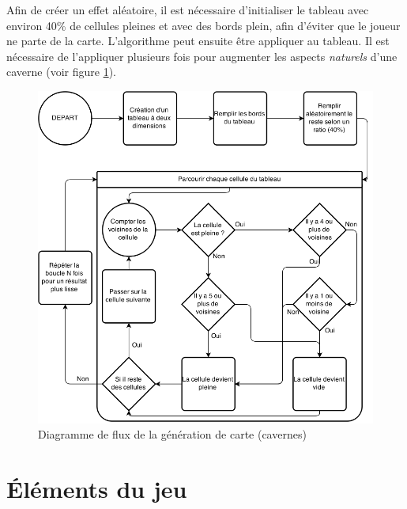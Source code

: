 \documentclass[11pt, a4paper, oneside]{report}
\begin{document}
Afin de créer un effet aléatoire, il est nécessaire d'initialiser le tableau avec environ 40\% de cellules pleines et avec des bords plein, afin d'éviter que le joueur ne parte de la carte. L'algorithme peut ensuite être appliquer au tableau. Il est nécessaire de l'appliquer plusieurs fois pour augmenter les aspects \emph{naturels} d'une caverne (voir figure \ref{fig:mapgeneration}).
\begin{figure}[H]
	\begin{center}
	\includegraphics[width=1\textwidth]{mapgeneration}
	\caption{Diagramme de flux de la génération de carte (cavernes)}
	\label{fig:mapgeneration}
	\end{center}
\end{figure}
\section{Éléments du jeu}
\end{document}
